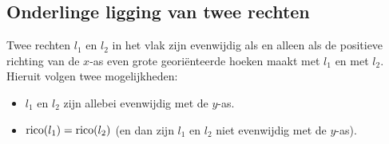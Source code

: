 \subsection{Onderlinge ligging van twee rechten}
\noindent

Twee rechten $l_1$ en $l_2$ in het vlak zijn evenwijdig als en alleen als de positieve richting van de $x$-as even grote geori\"enteerde hoeken maakt met $l_1$ en met $l_2$.
Hieruit volgen twee mogelijkheden:
\begin{itemize}
\item $l_1$ en $l_2$ zijn allebei evenwijdig met de $y$-as.
\item $\operatorname{rico} (l_1)=\operatorname{rico} (l_2)$ (en dan zijn $l_1$ en $l_2$ niet evenwijdig met de $y$-as).
\end{itemize}



